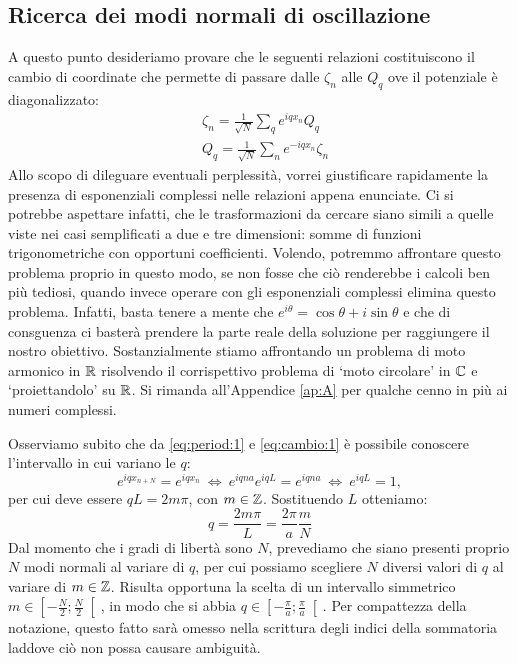     \subsection{Ricerca dei modi normali di oscillazione}
        A questo punto desideriamo provare che le seguenti relazioni costituiscono il cambio di coordinate che permette di passare dalle $\zeta_n$ alle $Q_q$ ove il potenziale \`e diagonalizzato:
        \begin{align}
            &\zeta_n=\frac{1}{\sqrt{N}}\sum_q e^{iqx_n}Q_q \label{eq:cambio:1}\\
            &Q_q=\frac{1}{\sqrt{N}}\sum_n e^{-iqx_n}\zeta_n \label{eq:cambio:2}
        \end{align}
        Allo scopo di dileguare eventuali perplessit\`a, vorrei giustificare rapidamente la presenza di esponenziali complessi nelle relazioni appena enunciate. Ci si potrebbe aspettare infatti, che le trasformazioni da cercare siano simili a quelle viste nei casi semplificati a due e tre dimensioni: somme di funzioni trigonometriche con opportuni coefficienti. Volendo, potremmo affrontare questo problema proprio in questo modo, se non fosse che ci\`o renderebbe i calcoli ben pi\`u tediosi, quando invece operare con gli esponenziali complessi elimina questo problema. Infatti, basta tenere a mente che $e^{i\theta}=\cos\theta+i\sin\theta$ e che di consguenza ci baster\`a prendere la parte reale della soluzione per raggiungere il nostro obiettivo. Sostanzialmente stiamo affrontando un problema di moto armonico in $\mathbb{R}$ risolvendo il corrispettivo problema di `moto circolare' in $\mathbb{C}$ e `proiettandolo' su $\mathbb{R}$. Si rimanda all'Appendice \ref{ap:A} per qualche cenno in pi\`u ai numeri complessi.
        \par Osserviamo subito che da \eqref{eq:period:1} e \eqref{eq:cambio:1} \`e possibile conoscere l'intervallo in cui variano le $q$:
            $$e^{iqx_{n+N}}=e^{iqx_n}\ \iff\ e^{iqna}e^{iqL}=e^{iqna}\ \iff\ e^{iqL}=1,$$
        per cui deve essere $qL=2m\pi$, con $m\in\mathbb{Z}$. Sostituendo $L$ otteniamo:
        \begin{equation}
            q=\frac{2m\pi}{L}=\frac{2\pi}{a}\frac{m}{N}
            \label{eq:q}
        \end{equation}
        Dal momento che i gradi di libert\`a sono $N$, prevediamo che siano presenti proprio $N$ modi normali al variare di $q$, per cui possiamo scegliere $N$ diversi valori di $q$ al variare di $m\in\mathbb{Z}$. Risulta opportuna la scelta di un intervallo simmetrico $\displaystyle m\in\left[-\frac{N}{2};\frac{N}{2}\right[$, in modo che si abbia $\displaystyle q\in\left[-\frac{\pi}{a};\frac{\pi}{a}\right[$. Per compattezza della notazione, questo fatto sar\`a omesso nella scrittura degli indici della sommatoria laddove ci\`o non possa causare ambiguit\`a. 
